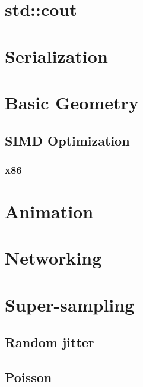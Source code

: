 \documentclass{article}
\begin{document}
	\section*{std::cout}
	\section*{Serialization}
	\section*{Basic Geometry}
	\subsection*{SIMD Optimization}
	\subsubsection*{x86}

	\section*{Animation}

	\section*{Networking}

	\section*{Super-sampling}
	\subsection*{Random jitter}
	\subsection*{Poisson}
\end{document}
